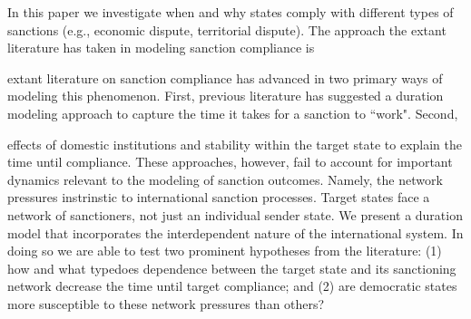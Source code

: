 In this paper we investigate when and why states comply with different types of sanctions (e.g., economic dispute, territorial dispute). The approach the extant literature has taken in modeling sanction compliance is 


 extant literature on sanction compliance has advanced in two primary ways of modeling this phenomenon. First, previous literature has suggested a duration modeling approach to capture the time it takes for a sanction to ``work". Second,  

effects of domestic institutions and stability within the target state to explain the time until compliance. These approaches, however, fail to account for important dynamics relevant to the modeling of sanction outcomes. Namely, the network pressures instrinstic to international sanction processes. Target states face a network of sanctioners, not just an individual sender state. We present a duration model that incorporates the interdependent nature of the international system. In doing so we are able to test two prominent hypotheses from the literature: (1) how and what typedoes dependence between the target state and its sanctioning network decrease the time until target compliance; and (2) are democratic states more susceptible to these network pressures than others?